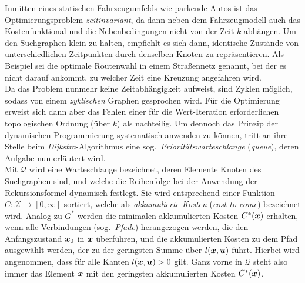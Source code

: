 Inmitten eines statischen Fahrzeugumfelds wie parkende Autos ist das Optimierungsproblem \emph{zeitinvariant}, da dann neben dem Fahrzeugmodell auch das Kostenfunktional und die Nebenbedingungen nicht von der Zeit $k$ abhängen. Um den Suchgraphen klein zu halten, empfiehlt es sich dann, identische Zustände von unterschiedlichen Zeitpunkten durch denselben Knoten zu repräsentieren. Als Beispiel sei die optimale Routenwahl in einem Straßennetz genannt, bei der es \iA nicht darauf ankommt, zu welcher Zeit eine Kreuzung angefahren wird. \\
Da das Problem nunmehr keine Zeitabhängigkeit aufweist, %
sind Zyklen möglich, sodass von einem \emph{zyklischen} Graphen gesprochen wird. Für die Optimierung erweist sich dann aber das Fehlen einer für die Wert-Iteration erforderlichen topologischen Ordnung (über $k$) als nachteilig. Um dennoch das Prinzip der dynamischen Programmierung systematisch anwenden zu können, tritt an ihre Stelle beim \emph{Dijkstra}-Algorithmus eine sog.\ \emph{Prioritätswarteschlange} (\emph{queue}), deren Aufgabe nun erläutert wird. \\ %
Mit $\mathcal Q$ wird eine Warteschlange bezeichnet, deren Elemente Knoten des Suchgraphen sind, und welche die  Reihenfolge bei der Anwendung der Rekursionsformel dynamisch festlegt.  Sie wird entsprechend einer Funktion $C: \mathcal X \rightarrow [0,\infty]$ sortiert, welche als \emph{akkumulierte Kosten} (\emph{cost-to-come}) bezeichnet wird. Analog zu $G^\ast$ werden die minimalen akkumulierten Kosten $C^\ast(\boldsymbol{x})$ erhalten, wenn alle Verbindungen (sog.\ \emph{Pfade}) herangezogen werden, die den Anfangszustand $\boldsymbol{x}_0$ in $\boldsymbol{x}$ überführen, und die akkumulierten Kosten zu dem Pfad ausgewählt werden, der zu der geringsten Summe über $l(\boldsymbol{x}, \boldsymbol{u})$ führt. Hierbei wird angenommen, dass für alle Kanten $l(\boldsymbol{x}, \boldsymbol{u})>0$ gilt. Ganz vorne in $\mathcal Q$ steht also immer das Element $\boldsymbol{x}$ mit den geringsten akkumulierten Kosten $C^\ast(\boldsymbol{x})$.
%
%
